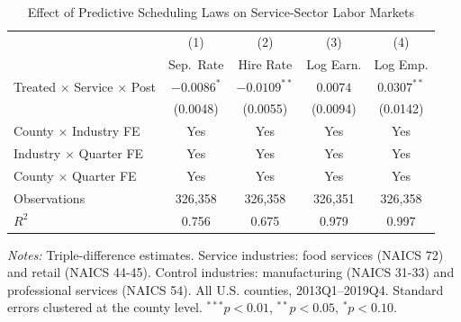 \begin{table}[htbp]
\centering
\caption{Effect of Predictive Scheduling Laws on Service-Sector Labor Markets}
\label{tab:main_ddd}
\begin{threeparttable}
\begin{tabular}{lcccc}
\toprule
 & (1) & (2) & (3) & (4) \\
 & Sep.\ Rate & Hire Rate & Log Earn. & Log Emp. \\
\midrule
Treated $\times$ Service $\times$ Post & $-0.0086^{*}$ & $-0.0109^{**}$ & $0.0074$ & $0.0307^{**}$ \\
 & (0.0048) & (0.0055) & (0.0094) & (0.0142) \\
\midrule
County $\times$ Industry FE & Yes & Yes & Yes & Yes \\
Industry $\times$ Quarter FE & Yes & Yes & Yes & Yes \\
County $\times$ Quarter FE & Yes & Yes & Yes & Yes \\
Observations & 326,358 & 326,358 & 326,351 & 326,358 \\
$R^2$ & 0.756 & 0.675 & 0.979 & 0.997 \\
\bottomrule
\end{tabular}
\begin{tablenotes}[flushleft]\small
\item \textit{Notes:} Triple-difference estimates. Service industries: food services (NAICS 72) and retail (NAICS 44-45). Control industries: manufacturing (NAICS 31-33) and professional services (NAICS 54). All U.S. counties, 2013Q1--2019Q4. Standard errors clustered at the county level. $^{***}p<0.01$, $^{**}p<0.05$, $^{*}p<0.10$.
\end{tablenotes}
\end{threeparttable}
\end{table}
